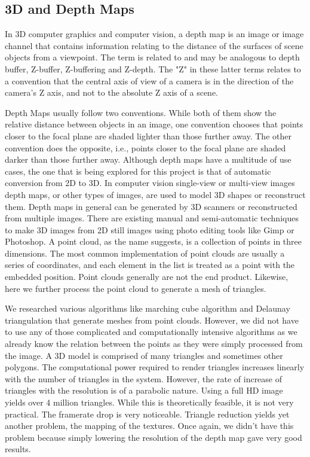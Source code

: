 \documentclass{article}
\begin{document}
\subsection{3D and Depth Maps}

In 3D computer graphics and computer vision, a depth map is an image or image channel that contains information relating to the distance of the surfaces of scene objects from a viewpoint. The term is related to and may be analogous to depth buffer, Z-buffer, Z-buffering and Z-depth. The "Z" in these latter terms relates to a convention that the central axis of view of a camera is in the direction of the camera's Z axis, and not to the absolute Z axis of a scene.

Depth Maps usually follow two conventions. While both of them show the relative distance between objects in an image, one convention chooses that points closer to the focal plane are shaded lighter than those further away. The other convention does the opposite, i.e., points closer to the focal plane are shaded darker than those further away.
Although depth maps have a multitude of use cases, the one that is being explored for this project is that of automatic conversion from 2D to 3D. In computer vision single-view or multi-view images depth maps, or other types of images, are used to model 3D shapes or reconstruct them. Depth maps in general can be generated by 3D scanners or reconstructed from multiple images.
There are existing manual and semi-automatic techniques to make 3D images from 2D still images using photo editing tools like Gimp or Photoshop.
A point cloud, as the name suggests, is a collection of points in three dimensions. The most common implementation of point clouds are usually a series of coordinates, and each element in the list is treated as a point with the embedded position. Point clouds generally are not the end product. Likewise, here we further process the point cloud to generate a mesh of triangles.

We researched various algorithms like marching cube algorithm and Delaunay triangulation that generate meshes from point clouds. However, we did not have to use any of those complicated and computationally intensive algorithms as we already know the relation between the points as they were simply processed from the image.
A 3D model is comprised of many triangles and sometimes other polygons. The computational power required to render triangles increases linearly with the number of triangles in the system. However, the rate of increase of triangles with the resolution is of a parabolic nature. Using a full HD image yields over 4 million triangles. While this is theoretically feasible, it is not very practical. The framerate drop is very noticeable. Triangle reduction yields yet another problem, the mapping of the textures. Once again, we didn’t have this problem because simply lowering the resolution of the depth map gave very good results.
    
\end{document}
